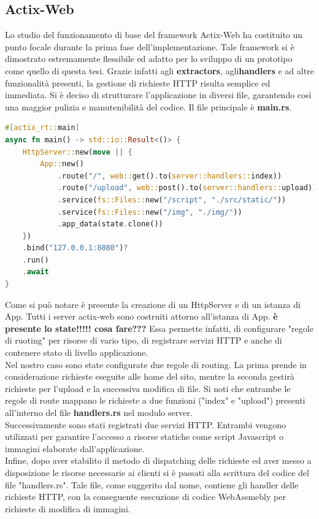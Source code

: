 \subsection{Actix-Web}
Lo studio del funzionamento di base del framework Actix-Web ha costituito un punto focale durante la prima fase dell'implementazione.
Tale framework si è dimostrato estremamente flessibile ed adatto per lo sviluppo di un prototipo come quello di questa tesi. Grazie infatti agli \textbf{extractors}, agli\textbf{handlers} e ad altre funzionalità presenti, la gestione di richieste HTTP risulta semplice ed immediata.
Si è deciso di strutturare l'applicazione in diversi file, garantendo così una maggior pulizia e manutenibilità del codice. Il file principale è \textbf{main.rs}.
\begin{lstlisting}[language=rust, label=lst:RustWasi, caption={Porzione del file main.rs}, showstringspaces=false]
#[actix_rt::main]
async fn main() -> std::io::Result<()> {
    HttpServer::new(move || {
        App::new()
            .route("/", web::get().to(server::handlers::index))
            .route("/upload", web::post().to(server::handlers::upload))
            .service(fs::Files::new("/script", "./src/static/"))
            .service(fs::Files::new("/img", "./img/"))
            .app_data(state.clone())
    })
    .bind("127.0.0.1:8080")?
    .run()
    .await
}
\end{lstlisting}
Come si può notare è presente la creazione di un HttpServer e di un istanza di App. Tutti i server actix-web sono costruiti attorno all'istanza di App.
\textbf{è presente lo state!!!!! cosa fare???} Essa permette infatti, di configurare "regole di ruoting" per risorse di vario tipo, di registrare servizi HTTP e anche di contenere stato di livello applicazione. 
\\Nel nostro caso sono state configurate due regole di routing. La prima prende in considerazione richieste eseguite alle home del sito, mentre la seconda gestirà richieste per l'upload e la successiva modifica di file. Si noti che entrambe le regole di route mappano le richieste a due funzioni ("index" e "upload") presenti all'interno del file \textbf{handlers.rs} nel modulo server.
\\Successivamente sono stati registrati due servizi HTTP. Entrambi vengono utilizzati per garantire l'accesso a risorse statiche come script Javascript o immagini elaborate dall'applicazione.
\\Infine, dopo aver stabilito il metodo di dispatching delle richieste ed aver messo a disposizione le risorse necessarie ai clienti si è passati alla scrittura del codice del file "handlers.rs". Tale file, come suggerito dal nome, contiene gli handler delle richieste HTTP, con la conseguente esecuzione di codice WebAssmebly per richieste di modifica di immagini.

